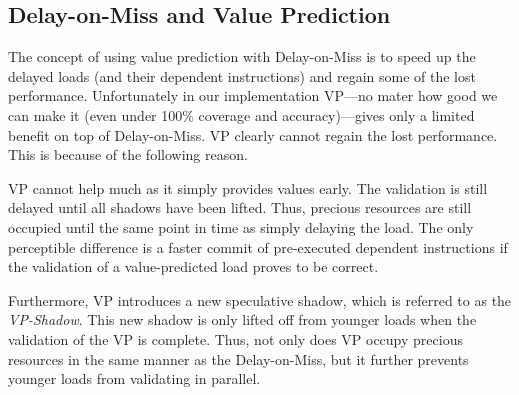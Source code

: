 \fi

\subsection{Delay-on-Miss and Value Prediction} 

The concept of using value prediction with Delay-on-Miss is to speed up the delayed loads (and their dependent instructions) and regain some of the lost performance. Unfortunately in our implementation VP---no mater how good we can make it (even under 100\% coverage and accuracy)---gives only a limited benefit on top of Delay-on-Miss. VP clearly cannot regain the lost performance. This is because of the following reason.


VP cannot help much as it simply provides values early. The validation is still delayed until all shadows have been lifted. Thus, precious resources are still occupied until the same point in time as simply delaying the load.
The only perceptible difference is a faster commit of pre-executed dependent instructions if the validation of a value-predicted load proves to be correct.

Furthermore, VP introduces a new speculative shadow, which is referred to as the \emph{VP-Shadow}. This new shadow is only lifted off from younger loads when the validation of the VP is complete. Thus, not only does VP occupy precious resources in the same manner as the Delay-on-Miss, but it further prevents younger loads from validating in parallel. 

